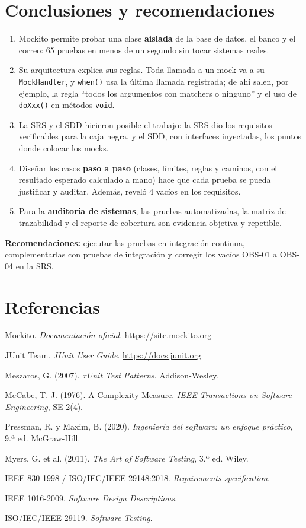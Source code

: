 \documentclass[11pt,a4paper,oneside]{report}
\newcommand{\code}[1]{\texttt{#1}}
\begin{document}
\chapter{Conclusiones y recomendaciones}
\begin{enumerate}
  \item Mockito permite probar una clase \textbf{aislada} de la base de datos, el banco y el correo: 65 pruebas en menos de un segundo sin tocar sistemas reales.
  \item Su arquitectura explica sus reglas. Toda llamada a un mock va a su \code{MockHandler}, y \code{when()} usa la última llamada registrada; de ahí salen, por ejemplo, la regla ``todos los argumentos con matchers o ninguno'' y el uso de \code{doXxx()} en métodos \code{void}.
  \item La SRS y el SDD hicieron posible el trabajo: la SRS dio los requisitos verificables para la caja negra, y el SDD, con interfaces inyectadas, los puntos donde colocar los mocks.
  \item Diseñar los casos \textbf{paso a paso} (clases, límites, reglas y caminos, con el resultado esperado calculado a mano) hace que cada prueba se pueda justificar y auditar. Además, reveló 4 vacíos en los requisitos.
  \item Para la \textbf{auditoría de sistemas}, las pruebas automatizadas, la matriz de trazabilidad y el reporte de cobertura son evidencia objetiva y repetible.
\end{enumerate}
\textbf{Recomendaciones:} ejecutar las pruebas en integración continua, complementarlas con pruebas de integración y corregir los vacíos OBS-01 a OBS-04 en la SRS.

\chapter*{Referencias}
\begin{enumerate}[label={[\arabic*]}]
  \item Mockito. \emph{Documentación oficial}. \url{https://site.mockito.org}
  \item JUnit Team. \emph{JUnit User Guide}. \url{https://docs.junit.org}
  \item Meszaros, G. (2007). \emph{xUnit Test Patterns}. Addison-Wesley.
  \item McCabe, T. J. (1976). A Complexity Measure. \emph{IEEE Transactions on Software Engineering}, SE-2(4).
  \item Pressman, R. y Maxim, B. (2020). \emph{Ingeniería del software: un enfoque práctico}, 9.ª ed. McGraw-Hill.
  \item Myers, G. et al. (2011). \emph{The Art of Software Testing}, 3.ª ed. Wiley.
  \item IEEE 830-1998 / ISO/IEC/IEEE 29148:2018. \emph{Requirements specification}.
  \item IEEE 1016-2009. \emph{Software Design Descriptions}.
  \item ISO/IEC/IEEE 29119. \emph{Software Testing}.
\end{enumerate}
\end{document}
